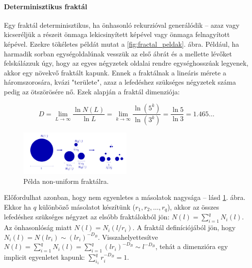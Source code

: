 \documentclass[12pt]{article}
\theoremstyle{plain}
\begin{document}
\paragraph{Determinisztikus fraktál}
Egy fraktál determinisztikus, ha önhasonló rekurzióval generálódik -- azaz vagy kicseréljük a részeit önmaga lekicsinyített képével vagy önmaga felnagyított képével. Ezekre tökéletes példát mutat a \ref{fig:fractal_peldak}. ábra. Például, ha harmadik sorban egységoldalúnak vesszük az első ábrát és a mellette lévőket felskálázzuk úgy, hogy az egyes négyzetek oldalai rendre egységhosszúak legyenek, akkor egy növekvő fraktált kapunk. Ennek a fraktálnak a lineáris mérete a háromszorosára, kvázi "területe", azaz a lefedéshez szükséges négyzetek száma pedig az ötszörösére nő. Ezek alapján a fraktál dimenziója:

\begin{equation}
D = \lim_{L \rightarrow \infty } \frac{\ln N \left( L\right) }{\ln L} = \lim_{k \rightarrow \infty} \frac{ \ln \left( 5 ^k\right) }{ \ln \left( 3^k\right)} = \frac{\ln 5}{ \ln 3} = 1.465\dots
\end{equation}

\begin{figure}[H]
    \begin{center}
    \includegraphics[width=0.5\textwidth]{media/fractal_non_uni.png}
    \caption{Példa non-uniform fraktálra. } 
    \label{fig:fractal_non_uni}
    \end{center}
\end{figure}

Előfordulhat azonban, hogy nem egyenletes a másolatok nagysága -- lásd \ref{fig:fractal_non_uni}. ábra. Ekkor ha $q$ különböző másolatot készítünk ($r_1, r_2, \dots, r_q$), akkor az összes lefedéshez szükséges négyzet az elsóbb fraktálokból jön: $N \left( l \right) = \sum_{i = 1}^q N_i\left( l\right)$. Az önhasonlóság miatt $ N\left( l\right) = N_i\left( l / r_i\right)$. A fraktál definíciójából jön, hogy $N_i \left( l\right) = N \left( lr_i \right) \sim \left( lr_i \right)^{-D_B}$. Visszahelyettesítve $N \left( l \right) = \sum_{i = 1}^q N_i\left( l\right) =\sum_{i = 1}^q \left( lr_i \right)^{-D_B} \sim l^{-D_B}$, tehát a dimenzióra egy implicit egyenletet kapunk: $\sum_{i_1}^q r_i^{-D_B} = 1$.
\end{document}
